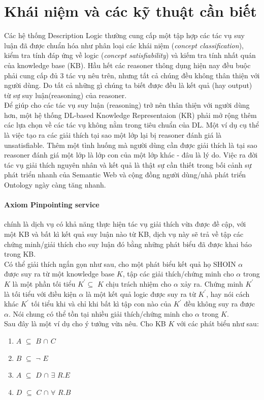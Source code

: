 \section{Khái niệm và các kỹ thuật cần biết}
\hspace*{0.05\textwidth} Các hệ thống Description Logic thường cung cấp một tập hợp các tác vụ suy luận đã được chuẩn hóa như phân loại các khái niệm (\textit{concept classification}), kiểm tra tính đáp ứng về logic (\textit{concept satisfiability}) và kiếm tra tính nhất quán của knowledge base (KB). Hầu hết các reasoner thông dụng hiện nay đều buộc phải cung cấp đủ 3 tác vụ nêu trên, nhưng tất cả chúng đều không thân thiện với người dùng. Do tất cả những gì chúng ta biết được đều là kết quả (hay output) từ sự suy luận(reasoning) của reasoner. 
\\
\hspace*{0.05\textwidth}  Để giúp cho các tác vụ suy luận (reasoning) trở nên thân thiện với người dùng hơn, một hệ thống DL-based Knowledge Representaion (KR) phải mở rộng thêm các lựa chọn về các tác vụ không nằm trong tiêu chuẩn của DL. Một ví dụ cụ thể là việc tạo ra các giải thích tại sao một lớp lại bị reasoner đánh giá là unsatisfiable. Thêm một tình huống mà người dùng cần được giải thích là tại sao reasoner đánh giá một lớp là lớp con của một lớp khác - đâu là lý do. Việc ra đời tác vụ giải thích nguyên nhân và kết quả là thật sự cần thiết trong bối cảnh sự phát triển nhanh của Semantic Web và cộng đồng người dùng/nhà phát triển Ontology ngày càng tăng nhanh.
\paragraph{Axiom Pinpointing service} chính là dịch vụ có khả năng thực hiện tác vụ giải thích vừa được đề cập, với một KB và bất kì kết quả suy luận nào từ KB, dịch vụ này sẽ trả về tập các chứng minh/giải thích cho suy luận đó bằng những phát biểu đã được khai báo trong KB.
\\
\hspace*{0.05\textwidth} Có thể giải thích ngắn gọn như sau, cho một phát biểu kết quả họ SHOIN $\alpha$ được suy ra từ một knowledge base $K$, tập các giải thích/chứng minh cho $\alpha$  trong $K$ là một phần tối tiểu $K^{'}\subseteq$ $K$ chịu trách nhiệm cho $\alpha$ xảy ra. Chứng minh $K^{'}$ là tối tiểu với điều kiện $\alpha$ là một kết quả logic được suy ra từ $K^{'}$, hay nói cách khác $K^{'}$ tối tiểu khi và chỉ khi bất kì tập con nào của $K^{'}$ đều không suy ra được $\alpha$. Nói chung có thể tồn tại nhiều giải thích/chứng minh cho $\alpha$ trong $K$.
\\
\hspace*{0.05\textwidth} Sau đây là một ví dụ cho ý tưởng vừa nêu. Cho KB $K$ với các phát biểu như sau:
\begin{enumerate}
\item	$A$ $\subseteq$ $B$ $\cap$ $C$ 
\item	$B$ $\subseteq$ $\neg$ $E$
\item	$A$ $\subseteq$ $D$ $\cap$ $\exists$ $R.E$ 
\item	$D$ $\subseteq$ $C$ $\cap$ $\forall$ $R.B$
\end{enumerate}

